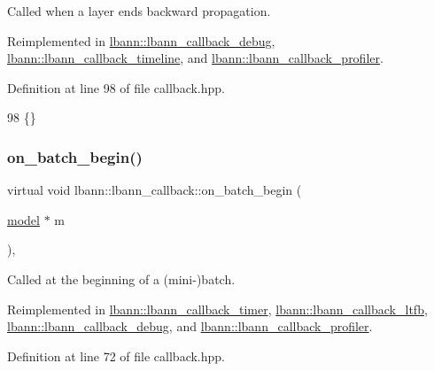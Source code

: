 Called when a layer ends backward propagation. 

Reimplemented in \hyperlink{classlbann_1_1lbann__callback__debug_a19a8ec63f55fc86024c9ab8fe0836500}{lbann\+::lbann\+\_\+callback\+\_\+debug}, \hyperlink{classlbann_1_1lbann__callback__timeline_a0de42325a96128f7e41ecf8004b99b26}{lbann\+::lbann\+\_\+callback\+\_\+timeline}, and \hyperlink{classlbann_1_1lbann__callback__profiler_a3fe2bc2b07b2e8e5873c9afb94cebe93}{lbann\+::lbann\+\_\+callback\+\_\+profiler}.



Definition at line 98 of file callback.\+hpp.


\begin{DoxyCode}
98 \{\}
\end{DoxyCode}
\mbox{\label{classlbann_1_1lbann__callback_a9ecf4e44cd4021cdd687de14c850cc83}} 
\subsubsection{\texorpdfstring{on\+\_\+batch\+\_\+begin()}{on\_batch\_begin()}}
{\footnotesize\ttfamily virtual void lbann\+::lbann\+\_\+callback\+::on\+\_\+batch\+\_\+begin (\begin{DoxyParamCaption}\item[{\hyperlink{classlbann_1_1model}{model} $\ast$}]{m }\end{DoxyParamCaption})\hspace{0.3cm}{\ttfamily [inline]}, {\ttfamily [virtual]}}

Called at the beginning of a (mini-\/)batch. 

Reimplemented in \hyperlink{classlbann_1_1lbann__callback__timer_aa6b016b9fb470a7614ab4147ae105002}{lbann\+::lbann\+\_\+callback\+\_\+timer}, \hyperlink{classlbann_1_1lbann__callback__ltfb_a7d2d1682c4a6a6b7e8ea1e3f4bf33c84}{lbann\+::lbann\+\_\+callback\+\_\+ltfb}, \hyperlink{classlbann_1_1lbann__callback__debug_abab8f3b9c1db3d0ef3a715afc7b880db}{lbann\+::lbann\+\_\+callback\+\_\+debug}, and \hyperlink{classlbann_1_1lbann__callback__profiler_a4a60f7470bf36c6833862d47d1a7ce01}{lbann\+::lbann\+\_\+callback\+\_\+profiler}.



Definition at line 72 of file callback.\+hpp.


